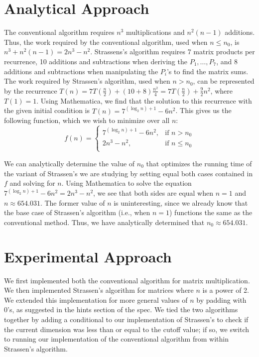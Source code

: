\documentclass[solution, letterpaper]{cs121}
\begin{document}

\section*{Analytical Approach}

\hspace{4mm} The conventional algorithm requires $n^3$ multiplications and $n^2(n-1)$ additions. Thus, the work required by the conventional algorithm, used when $n \leq n_0$, is $n^3 + n^2(n-1) = 2n^3 - n^2$. Strassens's algorithm requires 7 matrix products per recurrence, 10 additions and subtractions when deriving the $P_1, \ldots, P_7$, and 8 additions and subtractions when manipulating the $P_i$'s to find the matrix sums. The work required by Strassen's algorithm, used when $n > n_0$, can be represented by the recurrence $T(n) = 7T(\frac{n}{2}) + (10+8)\frac{n^2}{4} = 7T(\frac{n}{2}) + \frac{9}{2}n^2$, where $T(1) = 1$. Using Mathematica, we find that the solution to this recurrence with the given initial condition is $T(n) = 7^{(\log_2 n) + 1}-6 n^2$. This gives us the following function, which we wish to minimize over all $n$:
\[
    f(n)= 
\begin{cases}
    7^{(\log_2 n) + 1}-6 n^2, & \text{if } n > n_0 \\
    2n^3 - n^2, & \text{if } n \leq n_0\\
\end{cases}
\]

We can analytically determine the value of $n_0$ that optimizes the running time of the variant of Strassen's we are studying by setting equal both cases contained in $f$ and solving for $n$. Using Mathematica to solve the equation $7^{(\log_2 n) + 1}-6 n^2 = 2n^3 - n^2$, we see that both sides are equal when $n = 1$ and $n \approx 654.031$. The former value of $n$ is uninteresting, since we already know that the base case of Strassen's algorithm (i.e., when $n=1$) functions the same as the conventional method. Thus, we have analytically determined that $n_0 \approx 654.031$.

\section*{Experimental Approach}

\hspace{4mm}We first implemented both the conventional algorithm for matrix multiplication. We then implemented Strassen's algorithm for matrices where $n$ is a power of 2. We extended this implementation for more general values of $n$ by padding with 0's, as suggested in the hints section of the spec. We tied the two algorithms together by adding a conditional to our implementation of Strassen's to check if the current dimension was less than or equal to the cutoff value; if so, we switch to running our implementation of the conventional algorithm from within Strassen's algorithm. 
\end{document}
